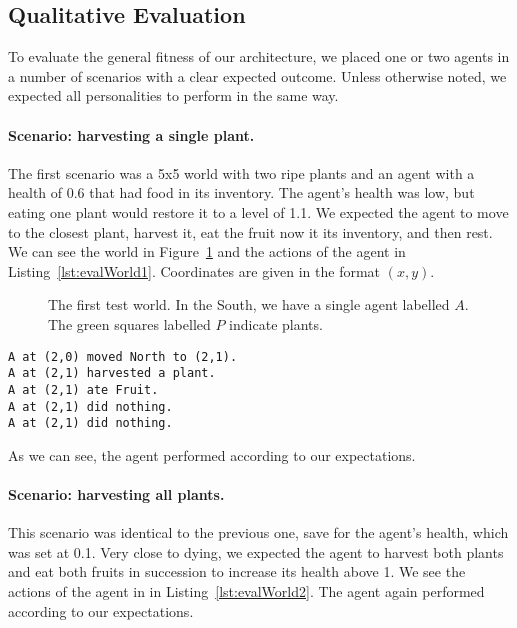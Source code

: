 \subsection{Qualitative Evaluation}

To evaluate the general fitness of our architecture, we placed one or two agents in a number of scenarios with a clear expected outcome. Unless otherwise noted, we expected all personalities to perform in the same way.

\paragraph{Scenario: harvesting a single plant.} The first scenario was a 5x5 world with two ripe plants and an agent with a health of 0.6 that had food in its inventory. The agent's health was low, but eating one plant would restore it to a level of 1.1. We expected the agent to move to the closest plant, harvest it, eat the fruit now it its inventory, and then rest. We can see the world in Figure~\ref{fig:evalWorld1} and the actions of the agent in Listing~\ref{lst:evalWorld1}. Coordinates are given in the format $(x,y)$.

\begin{figure}[h]
	\centering
	
	\caption{The first test world. In the South, we have a single agent labelled $A$. The green squares labelled $P$ indicate plants.}
	\label{fig:evalWorld1}
\end{figure}

\begin{lstlisting}[caption=Actions in the scenario ``harvesting a single plant''., label=lst:evalWorld1]
A at (2,0) moved North to (2,1).
A at (2,1) harvested a plant.
A at (2,1) ate Fruit.
A at (2,1) did nothing.
A at (2,1) did nothing.
\end{lstlisting}

As we can see, the agent performed according to our expectations.

\paragraph{Scenario: harvesting all plants.} This scenario was identical to the previous one, save for the agent's health, which was set at 0.1. Very close to dying, we expected the agent to harvest both plants and eat both fruits in succession to increase its health above 1. We see the actions of the agent in in Listing~\ref{lst:evalWorld2}. The agent again performed according to our expectations.

